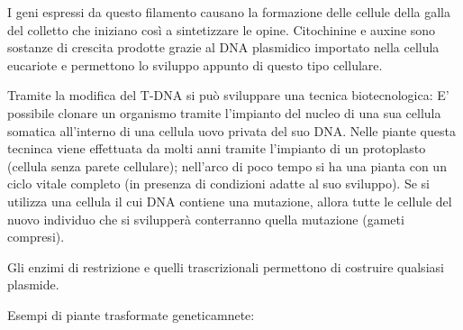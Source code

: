 \documentclass[]{article}
\begin{document}
I geni espressi da questo filamento causano la formazione delle cellule
della galla del colletto che iniziano così a sintetizzare le opine.
Citochinine e auxine sono sostanze di crescita prodotte grazie al DNA
plasmidico importato nella cellula eucariote e permettono lo sviluppo
appunto di questo tipo cellulare.

Tramite la modifica del T-DNA si può sviluppare una tecnica
biotecnologica: E' possibile clonare un organismo tramite l'impianto del
nucleo di una sua cellula somatica all'interno di una cellula uovo
privata del suo DNA. Nelle piante questa tecninca viene effettuata da
molti anni tramite l'impianto di un protoplasto (cellula senza parete
cellulare); nell'arco di poco tempo si ha una pianta con un ciclo vitale
completo (in presenza di condizioni adatte al suo sviluppo). Se si
utilizza una cellula il cui DNA contiene una mutazione, allora tutte le
cellule del nuovo individuo che si svilupperà conterranno quella
mutazione (gameti compresi).

Gli enzimi di restrizione e quelli trascrizionali permettono di
costruire qualsiasi plasmide.

Esempi di piante trasformate geneticamnete:
\end{document}
